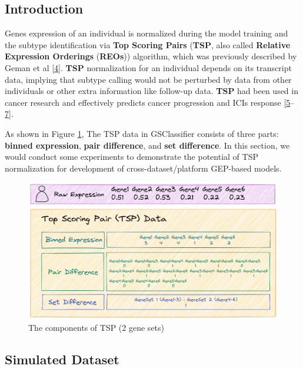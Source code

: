 \documentclass[
  12pt,
]{book}
\begin{document}
\hypertarget{tsp-intro}{%
\subsection{Introduction}\label{tsp-intro}}

Genes expression of an individual is normalized during the model training and the subtype identification via \textbf{Top Scoring Pairs} (\textbf{TSP}, also called \textbf{Relative Expression Orderings} (\textbf{REOs})) algorithm, which was previously described by Geman et al {[}\protect\hyperlink{ref-RN267}{4}{]}. \textbf{TSP} normalization for an individual depends on its transcript data, implying that subtype calling would not be perturbed by data from other individuals or other extra information like follow-up data. \textbf{TSP} had been used in cancer research and effectively predicts cancer progression and ICIs response {[}\protect\hyperlink{ref-RN265}{5}--\protect\hyperlink{ref-RN261}{7}{]}.

As shown in Figure \ref{fig:tsp}, The TSP data in GSClassifier consists of three parts: \textbf{binned expression}, \textbf{pair difference}, and \textbf{set difference}. In this section, we would conduct some experiments to demonstrate the potential of TSP normalization for development of cross-dataset/platform GEP-based models.

\begin{figure}

{\centering \includegraphics[width=0.85\linewidth]{./fig/TSP} 

}

\caption{The components of TSP (2 gene sets)}\label{fig:tsp}
\end{figure}

\hypertarget{simulated-dataset}{%
\subsection{Simulated Dataset}\label{simulated-dataset}}
\end{document}
